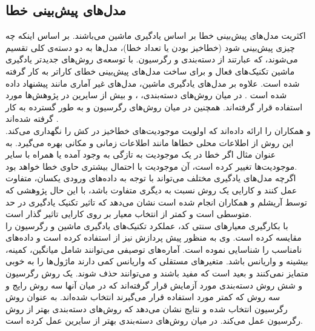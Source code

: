 
\subsection{مدل‌های پیش‌بینی خطا}
اکثریت مدل‌های پیش‌بینی خطا بر اساس یادگیری ماشین می‌باشند. بر اساس اینکه چه چیزی پیش‌بینی شود (خطاخیز بودن یا تعداد خطا)، مدل‌ها به دو دسته‌ی کلی تقسیم می‌شوند، که عبارتند از دسته‌بندی و رگرسیون. با توسعه‌ی روش‌های جدیدتر یادگیری ماشین تکنیک‌های فعال و  برای ساخت مدل‌های پیش‌بینی خطای کاراتر به کار گرفته شده است\cite{li2012sample}. علاوه بر مدل‌های یادگیری ماشین، مدل‌های غیر آماری مانند   پیشنهاد داده شده است \cite{kim2007predicting}. در میان روش‌های دسته‌بندی، 
 ،
 و
بیش از سایرین در پژوهش‌ها مورد استفاده قرار گرفته‌اند. همچنین در میان روش‌های رگرسیون 
 و 
به طور گسترده به کار گرفته شده‌اند \cite{nam2014survey}. \\
 و همکاران   را ارائه داده‌اند که  اولویت موجودیت‌های خطاخیز در کش  را نگهداری  می‌کند. این روش از اطلاعات محلی خطاها مانند اطلاعات زمانی و مکانی بهره می‌گیرد. به عنوان مثال اگر خطا در یک موجودیت به تازگی به وجود آمده یا همراه با سایر موجودیت‌ها تغییر کرده است، آن موجودیت با احتمال بیشتری حاوی خطا خواهد بود.\\
اگرچه مدل‌های یادگیری مختلف می‌تواند  با توجه به داده‌های ورودی یکسان، متفاوت عمل کنند و کارایی یک روش نسبت به دیگری متفاوت باشد، با این حال پژوهشی که توسط آریشلم  و همکاران  \cite{arisholm2010systematic} انجام شده است نشان می‌دهد که تاثیر  تکنیک یادگیری در حد متوسطی است و کمتر از انتخاب معیار بر روی کارایی تاثیر گذار است.  \\

 با بکارگیری معیارهای سنتی کد، عملکرد تکنیک‌های یادگیری ماشین و رگرسیون را مقایسه کرده است\cite{malhotra2014comparative}. وی به منظور پیش پردازش نیز از   استفاده کرده است و داده‌های نامناسب را شناسایی نموده است. آماره‌های توصیفی می‌توانند شامل میانگین، کمینه، بیشینه و واریانس باشد. متغیرهای مستقلی که  واریانس کمی دارند ماژول‌ها را به خوبی متمایز نمی‌کنند و بعید است که مفید باشند و می‌توانند حذف شوند. یک روش رگرسیون و شش روش دسته‌بندی مورد آزمایش قرار گرفته‌اند که در میان آنها سه روش رایج و سه روش که کمتر مورد استفاده قرار می‌گیرند انتخاب شده‌اند.  به عنوان روش رگرسیون انتخاب شده و نتایج نشان می‌دهد که روش‌های دسته‌بندی بهتر از روش رگرسیون عمل می‌کند. در میان روش‌های دسته‌بندی  بهتر از سایرین عمل کرده است. 


